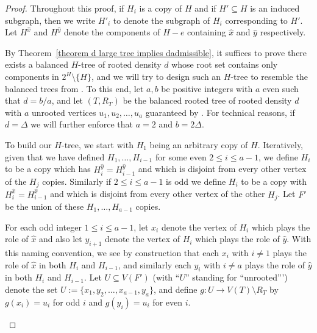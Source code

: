 \documentclass[12pt,letterpaper]{article}
\theoremstyle{definition}
\newcommand{\sub}{\subseteq}
\begin{document}
	\begin{proof}
		
		
		Throughout this proof, if $H_i$ is a copy of $H$ and if $H'\sub H$ is an induced subgraph, then we write $H'_i$ to denote the subgraph of $H_i$ corresponding to $H'$.  
		Let $H^{\hat{x}}$ and $H^{\hat{y}}$ denote the components of $H-e$ containing $\hat{x}$ and $\hat{y}$ respectively.
		
		By Theorem~\ref{theorem d large tree implies dadmissible}, it suffices to prove there exists a balanced $H$-tree of rooted density $d$ whose root set contains only components in $2^H\setminus\{H\}$, and we will try to design such an $H$-tree to resemble the balanced trees from .  To this end, let $a,b$ be positive integers with $a$ even such that $d=b/a$, and let $(T,R_T)$ be the balanced rooted tree of rooted density $d$ with $a$ unrooted vertices $u_1,u_2,\dots,u_a$ guaranteed by .  For technical reasons, if $d=\Delta$ we will further enforce that $a=2$ and $b=2\Delta$.
		
		To build our $H$-tree, we start with $H_1$ being an arbitrary copy of $H$.  Iteratively, given that we have defined $H_1,\ldots,H_{i-1}$ for some even $2\le i\le a-1$, we define $H_i$ to be a copy which has $H^{\hat{y}}_i=H^{\hat{y}}_{i-1}$ and which is disjoint from every other vertex of the $H_j$ copies.  Similarly if $2\le i\le a-1$ is odd we define $H_i$ to be a copy with $H^{\hat{x}}_i=H^{\hat{x}}_{i-1}$ and which is disjoint from every other vertex of the other $H_j$. Let $F'$ be the union of these $H_1,\ldots,H_{a-1}$ copies. 
		
		For each odd integer $1\le i\le a-1$, let $x_i$ denote the vertex of $H_i$ which plays the role of $\hat{x}$ and also let $y_{i+1}$ denote the vertex of $H_{i}$ which plays the role of $\hat{y}$.  With this naming convention, we see by construction that each $x_i$ with $i\ne 1$ plays the role of $\hat{x}$ in both $H_i$ and $H_{i-1}$, and similarly each $y_i$ with $i\ne a$ plays the role of $\hat{y}$ in both $H_i$ and $H_{i-1}$. Let $U\sub V(F')$ (with ``$U$'' standing for ``unrooted''') denote the set $U:=\{x_1,y_2,\ldots,x_{a-1},y_a\}$, and define $g:U \to V(T)\setminus R_T$ by $g(x_i)=u_i$ for odd $i$ and $g(y_i)=u_i$ for even $i$. 
		
		
		\begin{figure}
			\begin{center}
				\begin{subfigure}[t]{0.2\textwidth}
\end{subfigure}
\end{center}
\end{figure}
\end{proof}
\end{document}
